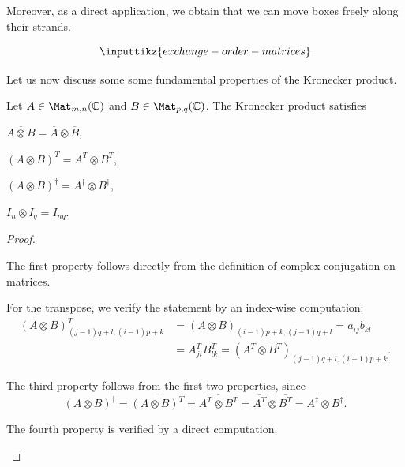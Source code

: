 \documentclass[a4paper,oneside, 12pt]{amsart}
\begin{document}
Moreover, as a direct application, we obtain that we can move boxes freely along their strands.

\begin{equation*}
  \inputtikz{exchange-order-matrices}
\end{equation*}

Let us now discuss some some fundamental properties of the Kronecker product.

\begin{lemma}\label{lem:props-of-tensor-products}
  Let \( A \in \Mat_{m,n}(\mathbb{C}) \) and \( B \in \Mat_{p,q}(\mathbb{C}) \).
  The Kronecker product satisfies
  \begin{thmlist}
    \item \(\overline{A \otimes B} = \overline{A} \otimes \overline{B}\),
    \item \((A \otimes B)^T = A^T \otimes B^T\),
    \item \((A \otimes B)^\dagger = A^\dagger \otimes B^\dagger\),
    \item \(I_n \otimes I_q = I_{nq}\).
  \end{thmlist}
\end{lemma}
\begin{proof}
  \begin{thmlist}
    \item The first property follows directly from the definition of complex conjugation on matrices.
    \item For the transpose, we verify the statement by an index-wise computation:
    \begin{align*}
      (A \otimes B)^T_{(j-1)q + l, (i-1)p + k}
      & = (A \otimes B)_{(i-1)p + k, (j-1)q + l}
        = a_{ij}b_{kl} \\
      & = A^T_{ji}B^T_{lk}
        = (A^T \otimes B^T)_{(j-1)q + l, (i-1)p + k}.
    \end{align*}
    \item The third property follows from the first two properties, since
    \begin{equation*}
      (A \otimes B)^\dagger = \overline{(A \otimes B)^T} = \overline{A^T \otimes B^T} = \overline{A^T} \otimes \overline{B^T} = A^\dagger \otimes B^\dagger.
    \end{equation*}
    \item The fourth property is verified by a direct computation. \qedhere
  \end{thmlist}
\end{proof}
\end{document}
